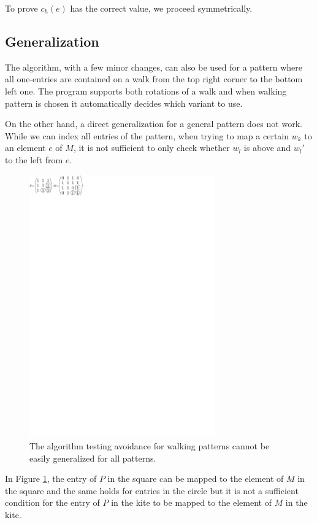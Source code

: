 To prove $c_h(e)$ has the correct value, we proceed symmetrically.

\subsection{Generalization}
The algorithm, with a few minor changes, can also be used for a pattern where all one-entries are contained on a walk from the top right corner to the bottom left one. The program supports both rotations of a walk and when walking pattern is chosen it automatically decides which variant to use.

On the other hand, a direct generalization for a general pattern does not work. While we can index all entries of the pattern, when trying to map a certain $w_k$ to an element $e$ of $M$, it is not sufficient to only check whether $w_l$ is above and $w_l'$ to the left from $e$.
\begin{figure}[h!]
\centering
\includegraphics[width=80mm]{../img/nogeneral.pdf}
\caption{The algorithm testing avoidance for walking patterns cannot be easily generalized for all patterns.}
\label{nogeneral}
\end{figure}

In Figure \ref{nogeneral}, the entry of $P$ in the square can be mapped to the element of $M$ in the square and the same holds for entries in the circle but it is not a sufficient condition for the entry of $P$ in the kite to be mapped to the element of $M$ in the kite.